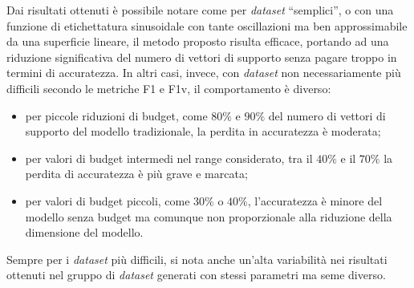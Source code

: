 Dai risultati ottenuti è possibile notare come per \emph{dataset} ``semplici'', o con una funzione di etichettatura sinusoidale con tante oscillazioni ma ben approssimabile da una superficie lineare, il metodo proposto risulta efficace, portando ad una riduzione significativa del numero di vettori di supporto senza pagare troppo in termini di accuratezza.
In altri casi, invece, con \emph{dataset} non necessariamente più difficili secondo le metriche F1 e F1v, il comportamento è diverso:
\begin{itemize}
    \item per piccole riduzioni di budget, come $80\%$ e $90\%$ del numero di vettori di supporto del modello tradizionale, la perdita in accuratezza è moderata;
    \item per valori di budget intermedi nel range considerato, tra il $40\%$ e il $70\%$ la perdita di accuratezza è più grave e marcata;
    \item per valori di budget piccoli, come $30\%$ o $40\%$, l'accuratezza è minore del modello senza budget ma comunque non proporzionale alla riduzione della dimensione del modello.
\end{itemize}
Sempre per i \emph{dataset} più difficili, si nota anche un'alta variabilità nei risultati ottenuti nel gruppo di \emph{dataset} generati con stessi parametri ma seme diverso.
